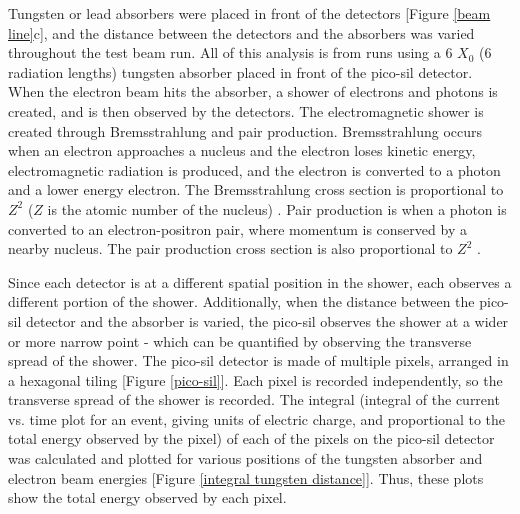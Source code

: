 \documentclass[twocolumn,aps,prd,reprint]{revtex4-1}
\begin{document}
Tungsten or lead absorbers were placed in front of the detectors [Figure \ref{beam line}c], and the distance between the detectors and the absorbers was varied throughout the test beam run. All of this analysis is from runs using a 6 $X_0$ (6 radiation lengths) tungsten absorber placed in front of the pico-sil detector. When the electron beam hits the absorber, a shower of electrons and photons is created, and is then observed by the detectors.  The electromagnetic shower is created through Bremsstrahlung and pair production. Bremsstrahlung occurs when an electron approaches a nucleus and the electron loses kinetic energy, electromagnetic radiation is produced, and the electron is converted to a photon and a lower energy electron. The Bremsstrahlung cross section is proportional to $Z^2$ ($Z$ is the atomic number of the nucleus) \cite{Leo}. Pair production is when a photon is converted to an electron-positron pair, where momentum is conserved by a nearby nucleus. The pair production cross section is also proportional to $Z^2$ \cite{Leo}.

Since each detector is at a different spatial position in the shower, each observes a different portion of the shower. Additionally, when the distance between the pico-sil detector and the absorber is varied, the pico-sil observes the shower at a wider or more narrow point - which can be quantified by observing the transverse spread of the shower. The pico-sil detector is made of multiple pixels, arranged in a hexagonal tiling [Figure \ref{pico-sil}]. Each pixel is recorded independently, so the transverse spread of the shower is recorded. The integral (integral of the current vs. time plot for an event, giving units of electric charge, and proportional to the total energy observed by the pixel) of each of the pixels on the pico-sil detector was calculated and plotted for various positions of the tungsten absorber and electron beam energies [Figure \ref{integral tungsten distance}]. Thus, these plots show the total energy observed by each pixel.
\end{document}
